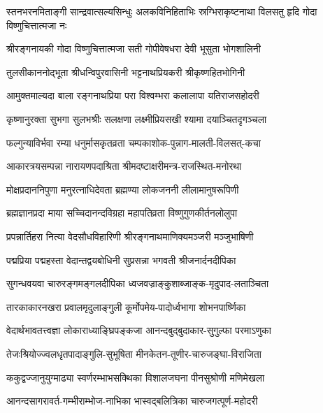 
{स्तनभरनमिताङ्गी  सान्द्रवात्सल्यसिन्धुः}
{अलकविनिहिताभिः  स्रग्भिराकृष्टनाथा}
{विलसतु  हृदि  गोदा  विष्णुचित्तात्मजा  नः}

\begin{minipage}{\linewidth}
\twolineshloka
{श्रीरङ्गनायकी  गोदा विष्णुचित्तात्मजा सती}
{गोपीवेषधरा  देवी  भूसुता  भोगशालिनी}
\end{minipage}

\twolineshloka
{तुलसीकाननोद्भूता  श्रीधन्विपुरवासिनी}
{भट्टनाथप्रियकरी  श्रीकृष्णहितभोगिनी}

\twolineshloka
{आमुक्तमाल्यदा  बाला  रङ्गनाथप्रिया  परा}
{विश्वम्भरा  कलालापा  यतिराजसहोदरी}

\twolineshloka
{कृष्णानुरक्ता  सुभगा  सुलभश्रीः  सलक्षणा}
{लक्ष्मीप्रियसखी  श्यामा  दयाञ्चितदृगञ्चला}

\twolineshloka
{फल्गुन्याविर्भवा  रम्या  धनुर्मासकृतव्रता}
{चम्पकाशोक-पुन्नाग-मालती-विलसत्-कचा}

\twolineshloka
{आकारत्रयसम्पन्ना  नारायणपदाश्रिता}
{श्रीमदष्टाक्षरीमन्त्र-राजस्थित-मनोरथा}

\twolineshloka
{मोक्षप्रदाननिपुणा  मनुरत्नाधिदेवता}
{ब्रह्मण्या  लोकजननी  लीलामानुषरूपिणी}

\twolineshloka
{ब्रह्मज्ञानप्रदा माया  सच्चिदानन्दविग्रहा}
{महापतिव्रता  विष्णुगुणकीर्तनलोलुपा}

\twolineshloka
{प्रपन्नार्तिहरा  नित्या  वेदसौधविहारिणी}
{श्रीरङ्गनाथमाणिक्यमञ्जरी  मञ्जुभाषिणी}

\twolineshloka
{पद्मप्रिया पद्महस्ता वेदान्तद्वयबोधिनी}
{सुप्रसन्ना भगवती श्रीजनार्दनदीपिका}

\twolineshloka
{सुगन्धवयवा चारुरङ्गमङ्गलदीपिका}
{ध्वजवज्राङ्कुशाब्जाङ्क-मृदुपाद-लताञ्चिता}

\twolineshloka
{तारकाकारनखरा  प्रवालमृदुलाङ्गुली}
{कूर्मोपमेय-पादोर्ध्वभागा  शोभनपार्ष्णिका}

\twolineshloka
{वेदार्थभावतत्त्वज्ञा लोकाराध्याङ्घ्रिपङ्कजा}
{आनन्दबुद्बुदाकार-सुगुल्फा  परमाऽणुका}

\twolineshloka
{तेजःश्रियोज्ज्वलधृतपादाङ्गुलि-सुभूषिता}
{मीनकेतन-तूणीर-चारुजङ्घा-विराजिता}

\twolineshloka
{ककुद्वज्जानुयुग्माढ्या  स्वर्णरम्भाभसक्थिका}
{विशालजघना  पीनसुश्रोणी  मणिमेखला}

\twolineshloka
{आनन्दसागरावर्त-गम्भीराम्भोज-नाभिका}
{भास्वद्बलित्रिका  चारुजगत्पूर्ण-महोदरी}

